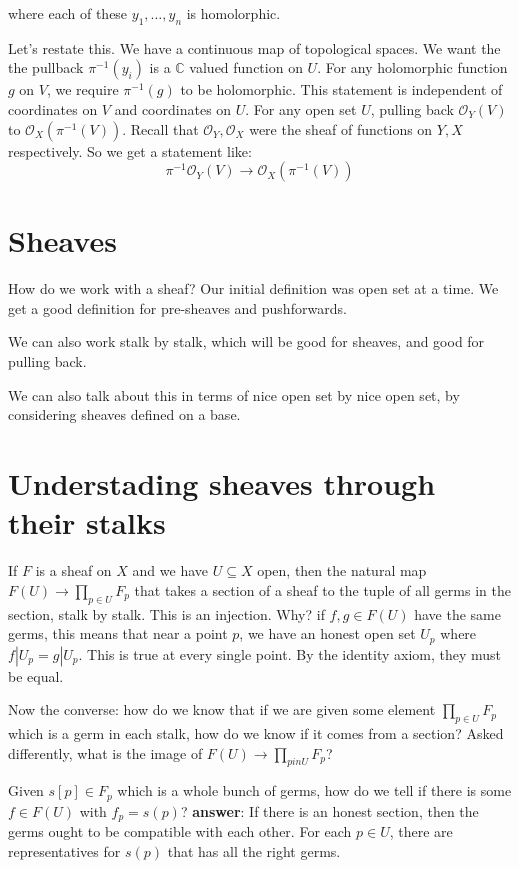 \documentclass{book}
\renewcommand{\O}{\ensuremath{\mathcal{O}}}
\theoremstyle{definition}
\begin{document}
where each of these $y_1, \dots, y_n$ is homolorphic. 

Let's restate this. We have a continuous map of topological spaces. We want the
the pullback $\pi^{-1}(y_i)$ is a $\mathbb C$ valued function on $U$. For
any holomorphic function $g$ on $V$, we require $\pi^{-1}(g)$ to be holomorphic.
This statement is independent of coordinates on $V$ and coordinates on $U$. For 
any open set $U$, pulling back $\O_Y(V)$ to $\O_X(\pi^{-1}(V))$. Recall that $\O_Y, \O_X$
were the sheaf of functions on $Y, X$ respectively. So we get a statement
like:
\[
    \pi^{-1} \O_Y(V) \rightarrow \O_X(\pi^{-1}(V))
\]

\section{Sheaves}

How do we work with a sheaf? Our initial definition was open set at a time. We
get a good definition for pre-sheaves and pushforwards.

We can also work stalk by stalk, which will be good for sheaves, and good
for pulling back.

We can also talk about this in terms of nice open set by nice open set, by 
considering sheaves defined on a base.

\section{Understading sheaves through their stalks}
If $F$ is a sheaf on $X$ and we have $U \subseteq X$ open, then the natural map
$F(U) \rightarrow \prod_{p \in U} F_p$ that takes a section of a sheaf to the
tuple of all germs in the section, stalk by stalk. This is an injection. Why? 
if $f, g \in F(U)$ have the same germs, this means that near a point $p$,
we have an honest open set $U_p$ where $f|U_p = g|U_p$. This is true at 
every single point. By the identity axiom, they must be equal.

Now the converse: how do we know that if we are given some element $\prod_{p \in U} F_p$
which is a germ in each stalk, how do we know if it comes from a section? Asked
differently, what is the image of $F(U) \rightarrow \prod_{p in U} F_p$?

Given $s[p] \in F_p$ which is a whole bunch of germs, how do we tell
if there is some $f \in F(U)$ with $f_p = s(p)$? \textbf{answer}: If there
is an honest section, then the germs ought to be compatible with each other.
For each $p \in U$, there are representatives for $s(p)$ that has all
the right germs. 
\end{document}
